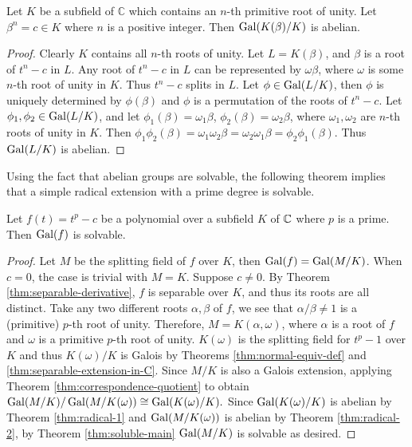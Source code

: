 \begin{theorem} \label{thm:radical-2}
	Let $K$ be a subfield of $\mathbb{C}$ which contains an $n$-th primitive root of unity. Let $\beta^n = c \in K $ where $n$ is a positive integer. Then $\operatorname{Gal}(K(\beta) / K)$ is abelian.
\end{theorem}

\begin{proof}
	Clearly $K$ contains all $n$-th roots of unity. Let $L = K(\beta)$, and $\beta$ is a root of $t^n-c$ in $L$. Any root of $t^n-c$ in $L$ can be represented by $\omega \beta$, where $\omega$ is some $n$-th root of unity in $K$. Thus $t^n - c$ splits in $L$.  Let $\phi \in \operatorname{Gal}(L / K)$, then $\phi$ is uniquely determined by $\phi(\beta)$ and $\phi$ is a permutation of the roots of $t^n - c$. Let $\phi_1, \phi_2 \in \operatorname{Gal}(L / K)$, and let $\phi_1(\beta) = \omega_1\beta$, $\phi_2(\beta) = \omega_2\beta$, where $\omega_1, \omega_2$ are $n$-th roots of unity in $K$. Then
	$
	\phi_1 \phi_2(\beta)=\omega_1 \omega_2 \beta=\omega_2 \omega_1  \beta=\phi_2 \phi_1(\beta).
	$
	Thus $\operatorname{Gal}(L / K)$ is abelian.
\end{proof}
Using the fact that abelian groups are solvable, the following theorem implies that a simple radical extension with a prime degree is solvable. 
\begin{theorem} \label{thm:radical-simple-solvable}
	Let $f(t) = t^p - c$ be a polynomial over a subfield $K$ of $\mathbb C$ where $p$ is a prime. Then $\operatorname{Gal}(f)$ is solvable. 
\end{theorem}
\begin{proof}
	Let $M$ be the splitting field of $f$ over $K$, then $\operatorname{Gal}(f) = \operatorname{Gal}(M / K)$. 
	When $c = 0$, the case is trivial with $M = K$. Suppose $c \neq 0$. By Theorem \ref{thm:separable-derivative}, $f$ is separable over $K$, and thus its roots are all distinct. Take any two different roots $\alpha, \beta$ of $f$, we see that $\alpha / \beta \neq 1$ is a (primitive) $p$-th root of unity. Therefore, $M = K(\alpha, \omega)$, where $\alpha$ is a root of $f$ and $\omega$ is a primitive $p$-th root of unity. $K(\omega)$ is the splitting field for $t^p - 1$ over $K$ and thus $K(\omega) / K$ is Galois by Theorems \ref{thm:normal-equiv-def} and \ref{thm:separable-extension-in-C}.  Since $M / K$ is also a Galois extension, applying Theorem \ref{thm:correspondence-quotient} to obtain $\operatorname{Gal}(M / K) / \operatorname{Gal}(M / K(\omega)) \cong \operatorname{Gal}(K(\omega) / K). $
	Since $\operatorname{Gal}(K(\omega)/K)$ is abelian by Theorem \ref{thm:radical-1} and $\operatorname{Gal}(M / K(\omega))$ is abelian by Theorem \ref{thm:radical-2}, by Theorem \ref{thm:soluble-main} $\operatorname{Gal}(M/K)$ is solvable as desired. 
\end{proof}

